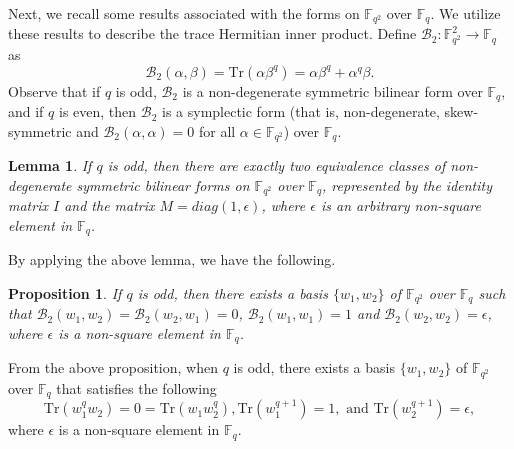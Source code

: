 \documentclass[12 pt]{extarticle}
\numberwithin{equation}{section}
\newtheorem{proposition}[theorem]{Proposition}
\newtheorem{lemma}[theorem]{Lemma}
\theoremstyle{definition}
\begin{document}
Next, we recall some results associated with the forms on $\mathbb{F}_{q^2}$ over $\mathbb{F}_q$. We utilize these results to describe the trace Hermitian inner product. Define 
$\mathcal{B}_2:\mathbb{F}_{q^2}^2\to \mathbb{F}_q$ as $$\mathcal{B}_2(\alpha,\beta)=\text{Tr}(\alpha\beta^q)=\alpha\beta^q+\alpha^q\beta.$$
Observe that if $q$ is odd, $\mathcal{B}_2$ is a non-degenerate symmetric bilinear form over $\mathbb{F}_q$, and if $q$ is even, then $\mathcal{B}_2$ is a symplectic form (that is, non-degenerate, skew-symmetric and $\mathcal{B}_2(\alpha,\alpha)=0$ for all $\alpha\in \mathbb{F}_{q^2}$) over $\mathbb{F}_q$.

\begin{lemma}\cite{Artin1957}
    If $q$ is odd, then there are exactly two equivalence classes of non-degenerate symmetric bilinear forms on $\mathbb{F}_{q^2}$ over $\mathbb{F}_q$, represented by the identity matrix $I$ and the matrix $M=diag(1,\epsilon)$, where $\epsilon$ is an arbitrary non-square element in $\mathbb{F}_q$.
\end{lemma}
 By applying the above lemma, we have the following. 
 \begin{proposition}
    If $q$ is odd, then there exists a basis $\{w_1,w_2\}$ of $\mathbb{F}_{q^2}$ over $\mathbb{F}_q$ such that $\mathcal{B}_2(w_1,w_2)=\mathcal{B}_2(w_2,w_1)=0$, $\mathcal{B}_2(w_1,w_1)=1$ and $\mathcal{B}_2(w_2,w_2)=\epsilon$, where $\epsilon$ is a non-square element in $\mathbb{F}_q$.  
 \end{proposition}

 From the above proposition, when $q$ is odd, there exists a basis $\{w_1,w_2\}$ of $\mathbb{F}_{q^2}$ over $\mathbb{F}_q$ that satisfies the following
 \begin{equation}\label{basis2}
     \text{Tr}(w_1^{q}w_2)=0= \text{Tr}(w_1w_2^{q}), \text{Tr}(w_1^{q+1})=1,\text{ and Tr}(w_2^{q+1})=\epsilon,
 \end{equation}
where $\epsilon$ is a non-square element in $\mathbb{F}_q$.
\end{document}
